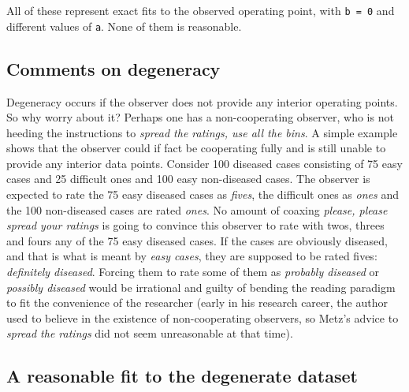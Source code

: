 \documentclass[
]{book}
\begin{document}
All of these represent exact fits to the observed operating point, with \texttt{b\ =\ 0} and different values of \texttt{a}. None of them is reasonable.

\hypertarget{comments-on-degeneracy}{%
\subsection{Comments on degeneracy}\label{comments-on-degeneracy}}

Degeneracy occurs if the observer does not provide any interior operating points. So why worry about it? Perhaps one has a non-cooperating observer, who is not heeding the instructions to \emph{spread the ratings, use all the bins}. A simple example shows that the observer could if fact be cooperating fully and is still unable to provide any interior data points. Consider 100 diseased cases consisting of 75 easy cases and 25 difficult ones and 100 easy non-diseased cases. The observer is expected to rate the 75 easy diseased cases as \emph{fives}, the difficult ones as \emph{ones} and the 100 non-diseased cases are rated \emph{ones}. No amount of coaxing \emph{please, please spread your ratings} is going to convince this observer to rate with twos, threes and fours any of the 75 easy diseased cases. If the cases are obviously diseased, and that is what is meant by \emph{easy cases}, they are supposed to be rated fives: \emph{definitely diseased}. Forcing them to rate some of them as \emph{probably diseased} or \emph{possibly diseased} would be irrational and guilty of bending the reading paradigm to fit the convenience of the researcher (early in his research career, the author used to believe in the existence of non-cooperating observers, so Metz's advice to \emph{spread the ratings} did not seem unreasonable at that time).

\hypertarget{a-reasonable-fit-to-the-degenerate-dataset}{%
\subsection{A reasonable fit to the degenerate dataset}\label{a-reasonable-fit-to-the-degenerate-dataset}}
\end{document}
